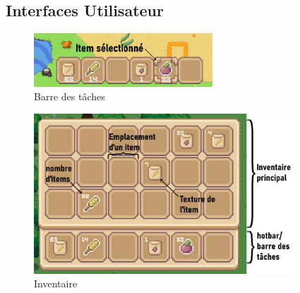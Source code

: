 \documentclass{article}
\begin{document}
    \subsection{Interfaces Utilisateur}
        \begin{figure}[h]  
            \includegraphics[height = 2cm]{hotbar.png}
            \centering
            \caption{Barre des tâches}
            \label{fig:hotbar}
        \end{figure}

        \begin{figure}[!h]  
            \includegraphics[height = 6cm]{inventory.png}
            \centering
            \caption{Inventaire}
            \label{fig:inventory}
        \end{figure}
\end{document}
